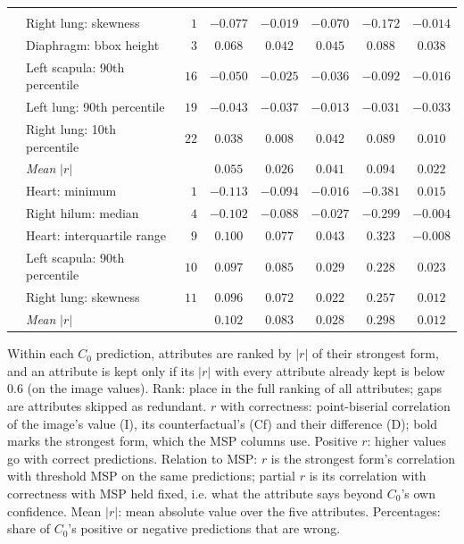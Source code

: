 \begin{table}[htbp]
\begin{threeparttable}
\begin{tabular}{llrccccc}
\midrule
\addlinespace
{} \\
\cmidrule(r){1-8}
 & Right lung: skewness & $1$ & $\mathbf{-0.077}$ & $-0.019$ & $-0.070$ & $-0.172$ & $-0.014$ \\
 & Diaphragm: bbox height & $3$ & $\mathbf{0.068}$ & $0.042$ & $0.045$ & $0.088$ & $0.038$ \\
 & Left scapula: 90th percentile & $16$ & $\mathbf{-0.050}$ & $-0.025$ & $-0.036$ & $-0.092$ & $-0.016$ \\
 & Left lung: 90th percentile & $19$ & $\mathbf{-0.043}$ & $-0.037$ & $-0.013$ & $-0.031$ & $-0.033$ \\
 & Right lung: 10th percentile & $22$ & $0.038$ & $0.008$ & $\mathbf{0.042}$ & $0.089$ & $0.010$ \\
\cmidrule(l){2-8}
 & \textit{Mean} $|r|$ &  & $0.055$ & $0.026$ & $0.041$ & $0.094$ & $0.022$ \\
\midrule
{} & Heart: minimum & $1$ & $\mathbf{-0.113}$ & $-0.094$ & $-0.016$ & $-0.381$ & $0.015$ \\
 & Right hilum: median & $4$ & $\mathbf{-0.102}$ & $-0.088$ & $-0.027$ & $-0.299$ & $-0.004$ \\
 & Heart: interquartile range & $9$ & $\mathbf{0.100}$ & $0.077$ & $0.043$ & $0.323$ & $-0.008$ \\
 & Left scapula: 90th percentile & $10$ & $\mathbf{0.097}$ & $0.085$ & $0.029$ & $0.228$ & $0.023$ \\
 & Right lung: skewness & $11$ & $\mathbf{0.096}$ & $0.072$ & $0.022$ & $0.257$ & $0.012$ \\
\cmidrule(l){2-8}
 & \textit{Mean} $|r|$ &  & $0.102$ & $0.083$ & $0.028$ & $0.298$ & $0.012$ \\
\bottomrule
\end{tabular}
\begin{tablenotes}\footnotesize
\item Within each $C_0$ prediction, attributes are ranked by $|r|$ of their strongest form, and an attribute is kept only if its $|r|$ with every attribute already kept is below $0.6$ (on the image values). Rank: place in the full ranking of all attributes; gaps are attributes skipped as redundant. $r$ with correctness: point-biserial correlation of the image's value (I), its counterfactual's (Cf) and their difference (D); bold marks the strongest form, which the MSP columns use. Positive $r$: higher values go with correct predictions. Relation to MSP: $r$ is the strongest form's correlation with threshold MSP on the same predictions; partial $r$ is its correlation with correctness with MSP held fixed, i.e. what the attribute says beyond $C_0$'s own confidence. Mean $|r|$: mean absolute value over the five attributes. Percentages: share of $C_0$'s positive or negative predictions that are wrong.
\end{tablenotes}
\end{threeparttable}
\end{table}
